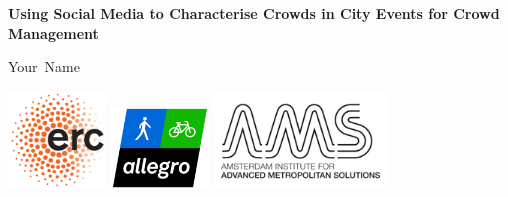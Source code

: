 \graphicspath{{./0-misc/images/}}



\newcommand{\thetitle}{Using Social Media to Characterise Crowds in City Events for Crowd Management} 
\newcommand{\thesubtitle}{} 
\newcommand{\theauthor}{Your\ Name}


\pagestyle{fancy} %
\thispagestyle{empty}
\vspace*{30mm}

\begin{center}
    \textbf{\huge \thetitle}\\[\baselineskip]\textbf{\LARGE \thesubtitle}
\end{center}


\vspace{40mm}

\begin{center}
    \Large\theauthor
\end{center}

\newpage

\thispagestyle{empty}

\vspace*{\fill}

\noindent \includegraphics[width=7em]{erc.png}\hspace*{0.75cm}
\includegraphics[width=7em]{allegro.png}\hspace*{0.75cm}
\includegraphics[width=12.5em]{ams.png}\hspace*{0.75cm}\\

